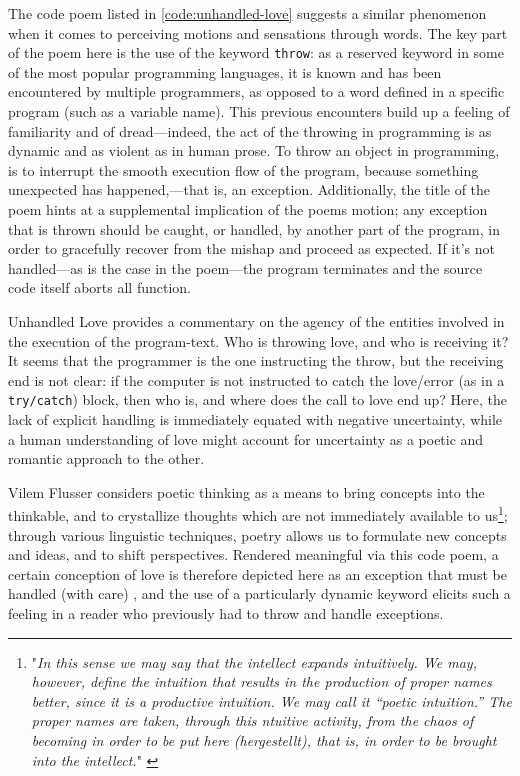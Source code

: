 The code poem listed in \autoref{code:unhandled-love} suggests a similar phenomenon when it comes to perceiving motions and sensations through words. The key part of the poem here is the use of the keyword \lstinline{throw}: as a reserved keyword in some of the most popular programming languages, it is known and has been encountered by multiple programmers, as opposed to a word defined in a specific program (such as a variable name). This previous encounters build up a feeling of familiarity and of dread—indeed, the act of the throwing in programming is as dynamic and as violent as in human prose. To throw an object in programming, is to interrupt the smooth execution flow of the program, because something unexpected has happened,—that is, an exception. Additionally, the title of the poem hints at a supplemental implication of the poems motion; any exception that is thrown should be caught, or handled, by another part of the program, in order to gracefully recover from the mishap and proceed as expected. If it's not handled—as is the case in the poem—the program terminates and the source code itself aborts all function.

Unhandled Love provides a commentary on the agency of the entities involved in the execution of the program-text. Who is throwing love, and who is receiving it? It seems that the programmer is the one instructing the throw, but the receiving end is not clear: if the computer is not instructed to catch the love/error (as in a \lstinline{try/catch}) block, then who is, and where does the call to love end up? Here, the lack of explicit handling is immediately equated with negative uncertainty, while a human understanding of love might account for uncertainty as a poetic and romantic approach to the other.

Vilem Flusser considers poetic thinking as a means to bring concepts into the thinkable, and to crystallize thoughts which are not immediately available to us\footnote{"\emph{In this sense we may say that the intellect expands intuitively. We may, however, define the intuition that results in the production of proper names better, since it is a productive intuition. We may call it “poetic intuition.” The proper names are taken, through this ntuitive activity, from the chaos of becoming in order to be put here (hergestellt), that is, in order to be brought into the intellect.}" \citep{flusser_doubt_2014}}; through various linguistic techniques, poetry allows us to formulate new concepts and ideas, and to shift perspectives. Rendered meaningful via this code poem, a certain conception of love is therefore depicted here as an exception that must be handled (with care) , and the use of a particularly dynamic keyword elicits such a feeling in a reader who previously had to throw and handle exceptions.

